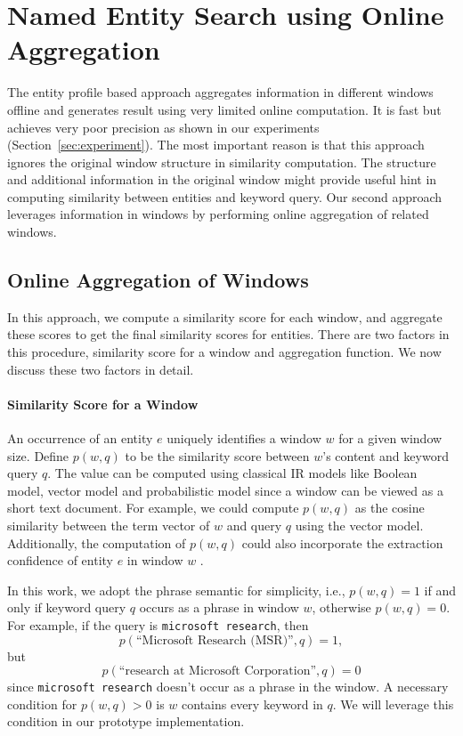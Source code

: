\documentclass{sig-alternate}
\theoremstyle{definition}
\begin{document}
\section{Named Entity Search using Online Aggregation}\label{sec:aggregation}
The entity profile based approach aggregates information in different windows offline and generates result using very limited online computation. It is fast but achieves very poor precision as shown in our experiments (Section~\ref{sec:experiment}). The most important reason is that this approach ignores the original window structure in similarity computation. The structure and additional information in the original window might provide useful hint in computing similarity between entities and keyword query. Our second approach leverages information in windows by performing online aggregation of related windows.

\subsection{Online Aggregation of Windows}
In this approach, we compute a similarity score for each window, and aggregate these scores to get the final similarity scores for entities. There are two factors in this procedure, similarity score for a window and aggregation function. We now discuss these two factors in detail.

\paragraph*{Similarity Score for a Window} An occurrence of an entity $e$ uniquely identifies a window $w$ for a given window size. Define $p(w, q)$ to be the similarity score between $w$'s content and keyword query $q$. The value can be computed using classical IR models like Boolean model, vector model and probabilistic model \cite{baeza1999modern} since a window can be viewed as a short text document. For example, we could compute $p(w, q)$ as the cosine similarity between the term vector of $w$ and query $q$ using the vector model. Additionally, the computation of $p(w, q)$ could also incorporate the extraction confidence of entity $e$ in window $w$ \cite{cheng2007entityrank}.

In this work, we adopt the phrase semantic for simplicity, i.e., $p(w, q) = 1$ if and only if keyword query $q$ occurs as a phrase in window $w$, otherwise $p(w, q) = 0$. For example, if the query is {\tt microsoft research}, then \[p(\mbox{``Microsoft Research (MSR)''}, q) = 1,\] but \[p(\mbox{``research at Microsoft Corporation''}, q) = 0\] since {\tt microsoft research} doesn't occur as a phrase in the window. A necessary condition for $p(w, q) > 0$ is $w$ contains every keyword in $q$. We will leverage this condition in our prototype implementation.
\end{document}
